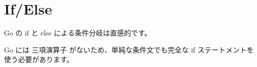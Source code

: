 \section{If/Else}

Go の if と else による条件分岐は直感的です。




Go には 三項演算子 がないため、単純な条件文でも完全な if ステートメントを 使う必要があります。